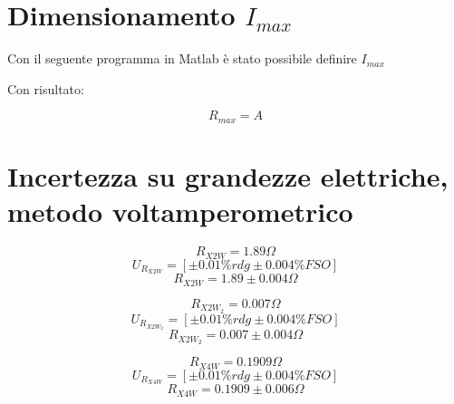 \documentclass[a4paper]{article}
\begin{document}
\section{Dimensionamento $I_{max}$}
Con il seguente programma in Matlab è stato possibile definire $I_{max}$

Con risultato: 
\begin{Large}
	\begin{equation}
		R_{max} = A
	 \end{equation}
\end{Large}
\section {Incertezza su grandezze elettriche, metodo voltamperometrico}

\begin{Large}
	\begin{equation}
		R_{X2W}= 1.89 \Omega
	\end{equation}
	\begin{equation}
		U_{R_{X2W}} = [\pm 0.01\%rdg \pm 0.004\% FSO]
	 \end{equation}
	 \begin{equation}
		R_{X2W} = 1.89 \pm 0.004 \Omega
	 \end{equation}
\end{Large}

\begin{Large}
	\begin{equation}
		R_{X2W_{2}} = 0.007 \Omega
	 \end{equation}
	\begin{equation}
		U_{R_{X2W_{2}}} = [\pm 0.01\%rdg \pm 0.004\% FSO]
	 \end{equation}
	 \begin{equation}
		R_{X2W_{2}} = 0.007 \pm 0.004 \Omega
	 \end{equation}
\end{Large}

\begin{Large}
	\begin{equation}
		R_{X4W}= 0.1909 \Omega
	\end{equation}
	\begin{equation}
		U_{R_{X4W}} = [\pm 0.01\%rdg \pm 0.004\% FSO]
	 \end{equation}
	 \begin{equation}
		R_{X4W} = 0.1909\pm 0.006 \Omega
	 \end{equation}
\end{Large}
\end{document}
